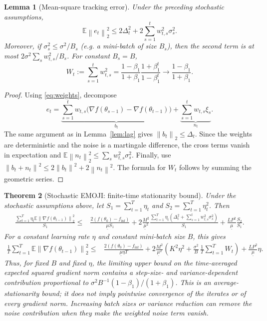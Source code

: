 \documentclass[11pt]{article}
\newtheorem{theorem}{Theorem}[section]
\newtheorem{lemma}[theorem]{Lemma}
\newcommand{\E}{\mathbb{E}}
\newcommand{\norm}[1]{\left\lVert #1\right\rVert}
\begin{document}
\begin{lemma}[Mean-square tracking error]\label{lem:stoch-error}
Under the preceding stochastic assumptions,
\begin{equation}
 \E\norm{e_t}_2^2
 \le2\Delta_t^2+2\sum_{s=1}^t w_{t,s}^2\sigma_s^2.
 \label{eq:stoch-error}
\end{equation}
Moreover, if $\sigma_s^2\le\sigma^2/B_s$ (e.g. a mini-batch of size $B_s$), then the second term is at most $2\sigma^2\sum_s w_{t,s}^2/B_s$. For constant $B_s=B$,
\begin{equation}
 W_t:=\sum_{s=1}^t w_{t,s}^2
 =\frac{1-\beta_1}{1+\beta_1}\frac{1+\beta_1^t}{1-\beta_1^t}
 \longrightarrow\frac{1-\beta_1}{1+\beta_1}.
 \label{eq:W}
\end{equation}
\end{lemma}

\begin{proof}
Using \eqref{eq:weights}, decompose
\[
 e_t=\underbrace{\sum_{s=1}^tw_{t,s}\bigl(\nabla f(\theta_{s-1})-\nabla f(\theta_{t-1})\bigr)}_{b_t}
 +\underbrace{\sum_{s=1}^tw_{t,s}\xi_s}_{n_t}.
\]
The same argument as in Lemma~\ref{lem:lag} gives $\norm{b_t}_2\le\Delta_t$. Since the weights are deterministic and the noise is a martingale difference, the cross terms vanish in expectation and
$\E\norm{n_t}_2^2\le\sum_s w_{t,s}^2\sigma_s^2$. Finally, use $\norm{b_t+n_t}^2\le2\norm{b_t}^2+2\norm{n_t}^2$. The formula for $W_t$ follows by summing the geometric series.
\end{proof}

\begin{theorem}[Stochastic EMOJI: finite-time stationarity bound]\label{thm:stoch}
Under the stochastic assumptions above, let $S_1=\sum_{t=1}^T\eta_t$ and $S_2=\sum_{t=1}^T\eta_t^2$. Then
\begin{align}
 \frac{\sum_{t=1}^T\eta_t\E\norm{\nabla f(\theta_{t-1})}_2^2}{S_1}
 \le{}&\frac{2(f(\theta_0)-f_{\inf})}{\underline\mu S_1}
 +2\frac{M^2}{\underline\mu^2}
 \frac{\sum_{t=1}^T\eta_t\left(\Delta_t^2+\sum_{s=1}^tw_{t,s}^2\sigma_s^2\right)}{S_1}
 +\frac{LP^2}{\underline\mu}\frac{S_2}{S_1}.
 \label{eq:stoch-general}
\end{align}
For a constant learning rate $\eta$ and constant mini-batch size $B$, this gives
\begin{align}
 \frac1T\sum_{t=1}^T\E\norm{\nabla f(\theta_{t-1})}_2^2
 \le{}&\frac{2(f(\theta_0)-f_{\inf})}{\underline\mu\eta T}
 +2\frac{M^2}{\underline\mu^2}
 \left(K^2\eta^2+\frac{\sigma^2}{B}\,\frac1T\sum_{t=1}^TW_t\right)
 +\frac{LP^2}{\underline\mu}\eta.
 \label{eq:stoch-constant}
\end{align}
Thus, for fixed $B$ and fixed $\eta$, the limiting upper bound on the time-averaged expected squared gradient norm contains a step-size- and variance-dependent contribution proportional to $\sigma^2 B^{-1}(1-\beta_1)/(1+\beta_1)$. This is an average-stationarity bound; it does not imply pointwise convergence of the iterates or of every gradient norm. Increasing batch sizes or variance reduction can remove the noise contribution when they make the weighted noise term vanish.
\end{theorem}
\end{document}
